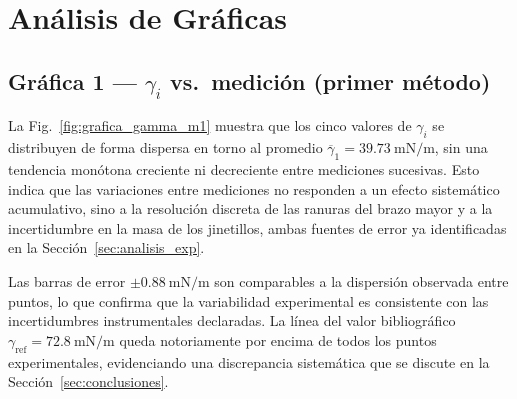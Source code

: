 
\section{Análisis de Gráficas}
\label{sec:analisis_graficas}

\subsection{Gráfica 1 --- \texorpdfstring{$\gamma_i$}{gamma} vs.\ medición (primer método)}

La Fig.~\ref{fig:grafica_gamma_m1} muestra que los cinco valores de
$\gamma_i$ se distribuyen de forma dispersa en torno al promedio
$\overline{\gamma}_1 = \qty{39.73}{\milli\newton\per\meter}$, sin una
tendencia monótona creciente ni decreciente entre mediciones sucesivas.
Esto indica que las variaciones entre mediciones no responden a un
efecto sistemático acumulativo, sino a la resolución discreta de las
ranuras del brazo mayor y a la incertidumbre en la masa de los
jinetillos, ambas fuentes de error ya identificadas en la
Sección~\ref{sec:analisis_exp}.

Las barras de error $\pm\qty{0.88}{\milli\newton\per\meter}$ son
comparables a la dispersión observada entre puntos, lo que confirma que
la variabilidad experimental es consistente con las incertidumbres
instrumentales declaradas. La línea del valor bibliográfico
$\gamma_{\text{ref}} = \qty{72.8}{\milli\newton\per\meter}$ queda
notoriamente por encima de todos los puntos experimentales, evidenciando
una discrepancia sistemática que se discute en la
Sección~\ref{sec:conclusiones}.